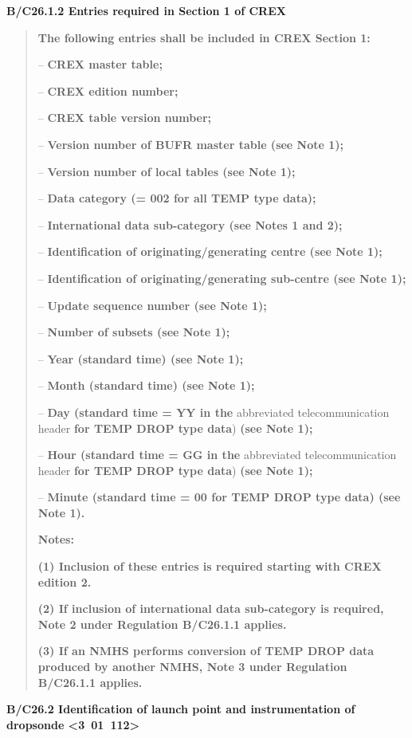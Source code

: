 \textbf{B/C26.1.2 Entries required in Section 1 of CREX}

\begin{quote}
\textbf{The following entries shall be included in CREX Section 1:}

-- \textbf{CREX master table;}

-- \textbf{CREX edition number;}

-- \textbf{CREX table version number;}

-- \textbf{Version number of BUFR master table (see Note 1);}

-- \textbf{Version number of local tables (see Note 1);}

-- \textbf{Data category (= 002 for all TEMP type data);}

-- \textbf{International data sub-category (see Notes 1 and 2);}

-- \textbf{Identification of originating/generating centre (see Note 1);}

-- \textbf{Identification of originating/generating sub-centre (see Note 1);}

-- \textbf{Update sequence number (see Note 1);}

-- \textbf{Number of subsets (see Note 1);}

-- \textbf{Year (standard time) (see Note 1);}

-- \textbf{Month (standard time) (see Note 1);}

-- \textbf{Day (standard time = YY in the} abbreviated telecommunication header \textbf{for TEMP DROP type data}) \textbf{(see Note 1);}

-- \textbf{Hour (standard time = GG in the} abbreviated telecommunication header \textbf{for TEMP DROP type data}) \textbf{(see Note 1);}

-- \textbf{Minute (standard time = 00 for TEMP DROP type data) (see Note 1).}

\textbf{Notes:}

\textbf{(1) Inclusion of these entries is required starting with CREX edition 2.}

\textbf{(2) If inclusion of international data sub-category is required, Note 2 under Regulation B/C26.1.1 applies.}

\textbf{(3) If an NMHS performs conversion of TEMP DROP data produced by another NMHS, Note 3 under Regulation B/C26.1.1 applies.}
\end{quote}

\textbf{B/C26.2 Identification of launch point and instrumentation of dropsonde \textless3~01~112\textgreater{}}


